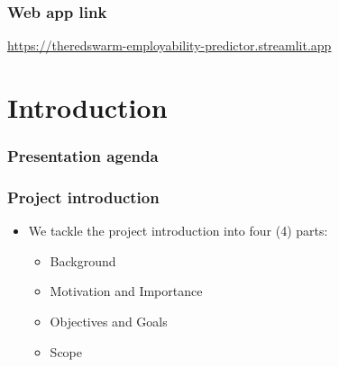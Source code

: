 \begin{frame}
\frametitle{Web app link}
\url{https://theredswarm-employability-predictor.streamlit.app}
\end{frame}

\section{Introduction}
\begin{frame}
\frametitle{Presentation agenda}
\tableofcontents[currentsection]
\end{frame}

\begin{frame}
\frametitle{Project introduction}
	\begin{itemize}
		\item We tackle the project introduction into four (4) parts:
			\begin{itemize}
				\item Background
				\item Motivation and Importance
				\item Objectives and Goals
				\item Scope
			\end{itemize}
	\end{itemize}
\end{frame}






